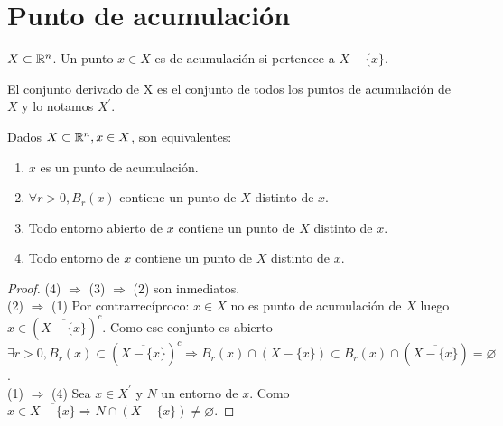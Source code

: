 \section{Punto de acumulación}

\begin{definition}
  \(X \subset \mathbb{R}^n\). Un punto \(x \in X\) es de acumulación si pertenece a \(\overline{X - \{ x \}} \).
\end{definition}

\begin{definition}
  El conjunto derivado de X es el conjunto de todos los puntos de acumulación de \(X\) y lo notamos \(X^\prime \).
\end{definition}

\begin{prop}
  Dados \(X \subset \mathbb{R}^n, x \in X\), son equivalentes:
  \begin{enumerate}
    \item \(x\) es un punto de acumulación.
    \item \(\forall r > 0, B_r(x)\) contiene un punto de \(X\) distinto de \(x\).
    \item Todo entorno abierto de \(x\) contiene un punto de \(X\) distinto de \(x\).
    \item Todo entorno de \(x\) contiene un punto de \(X\) distinto de \(x\).
  \end{enumerate}

  \begin{proof}
    (4) \(\Rightarrow \) (3) \(\Rightarrow \) (2) son inmediatos. \\
    (2) \(\Rightarrow \) (1) Por contrarrecíproco: \(x \in X\) no es punto de acumulación de \(X\) luego \(x \in {(\overline{X - \{x\}})}^c \). Como ese conjunto es abierto \(\exists r > 0, B_r(x) \subset {(\overline{X - \{ x \}})}^c \Rightarrow B_r(x) \cap (X - \{x \}) \subset B_r(x) \cap (\overline{X - \{x\}}) = \varnothing \). \\
    (1) \(\Rightarrow \) (4) Sea \(x \in X^{\prime} \) y \(N\) un entorno de \(x\). Como \(x \in \overline{X - \{x\}} \Rightarrow N \cap (X - \{x\}) \neq \varnothing \).
  \end{proof}
\end{prop}

